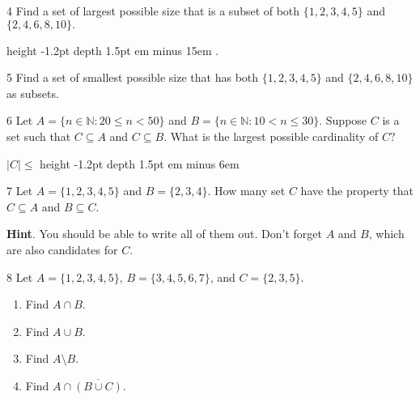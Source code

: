 \documentclass[11pt,]{book}
\newcommand{\fillin}[1]{\leavevmode\leaders\vrule height -1.2pt depth 1.5pt \hskip #1em minus #1em \null}
\theoremstyle{ptxplainnotitle}
\theoremstyle{ptxplaintitle}
\theoremstyle{ptxdefinitionnotitle}
\theoremstyle{ptxdefinitiontitle}
\theoremstyle{ptxdefinitionnotitle}
\theoremstyle{ptxdefinitiontitle}
\theoremstyle{ptxdefinitionnotitle}
\theoremstyle{ptxdefinitiontitle}
\theoremstyle{ptxdefinitiontitlenonumber}
\theoremstyle{ptxdefinitiontitlenonumber}
\numberwithin{equation}{chapter}
\newcommand{\N}{\mathbb N}
\newcommand{\st}{:}
\newcommand{\card}[1]{\left| #1 \right|}
\newcommand{\lt}{<}
\begin{document}
\begin{divisionexercise}{4}\hypertarget{exercise-81}{}
\hypertarget{p-868}{}%
Find a set of largest possible size that is a subset of both \(\{1, 2, 3, 4, 5\}\) and \(\{2, 4, 6, 8,10\}\text{.}\)%
\par
\hypertarget{p-869}{}%
 \fillin{15}.%
\end{divisionexercise}%
\begin{divisionexercise}{5}\hypertarget{exercise-82}{}
\hypertarget{p-874}{}%
Find a set of smallest possible size that has both \(\{1,2,3,4,5\}\) and \(\{2,4,6,8,10\}\) as subsets.%
\end{divisionexercise}%
\begin{divisionexercise}{6}\hypertarget{exercise-83}{}
\hypertarget{p-880}{}%
Let \(A = \{n \in \N \st 20 \le n \lt 50\}\) and \(B = \{n \in \N \st 10 \lt n \le 30\}\text{.}\) Suppose \(C\) is a set such that \(C \subseteq A\) and \(C \subseteq B\text{.}\)  What is the largest possible cardinality of \(C\text{?}\)%
\par
\hypertarget{p-881}{}%
\(\card{C} \le\) \fillin{6}%
\end{divisionexercise}%
\begin{divisionexercise}{7}\hypertarget{exercise-84}{}
\hypertarget{p-887}{}%
Let \(A = \{1,2,3,4,5\}\) and \(B = \{2, 3, 4\}\text{.}\)  How many set \(C\) have the property that \(C \subseteq A\) and \(B \subseteq C\text{.}\)%
\par\smallskip%
\noindent\textbf{Hint}.\hypertarget{hint-6}{}\quad%
\hypertarget{p-889}{}%
You should be able to write all of them out.  Don't forget \(A\) and \(B\text{,}\) which are also candidates for \(C\text{.}\)%
\end{divisionexercise}%
\begin{divisionexercise}{8}\hypertarget{exercise-85}{}
\hypertarget{p-901}{}%
Let \(A = \{1,2,3,4,5\}\text{,}\) \(B = \{3,4,5,6,7\}\text{,}\) and \(C = \{2,3,5\}\text{.}\) \leavevmode%
\begin{enumerate}[label=\alph*.]
\item\hypertarget{li-389}{}\hypertarget{p-902}{}%
Find \(A \cap B\text{.}\)%
\item\hypertarget{li-390}{}\hypertarget{p-904}{}%
Find \(A \cup B\text{.}\)%
\item\hypertarget{li-391}{}\hypertarget{p-906}{}%
Find \(A \setminus B\text{.}\)%
\item\hypertarget{li-392}{}\hypertarget{p-908}{}%
Find \(A \cap \overline{(B \cup C)}\text{.}\)%
\end{enumerate}
%
\end{divisionexercise}%
\end{document}
